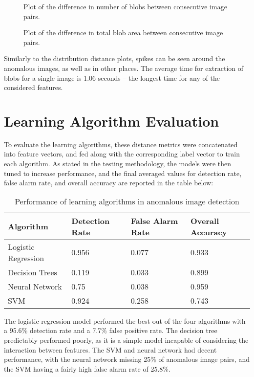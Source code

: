 \begin{figure}[htb]
\centering
\scalebox{1.0}{}
\caption{Plot of the difference in number of blobs between consecutive image pairs.}
\label{fig:tamu-fig3}
\end{figure}



\begin{figure}[htb]
\centering
\scalebox{1.0}{}
\caption{Plot of the difference in total blob area between consecutive image pairs.}
\label{fig:tamu-fig3}
\end{figure}

Similarly to the distribution distance plots, spikes can be seen around the anomalous images, as well as in other places.
The average time for extraction of blobs for a single image is 1.06 seconds -- the longest time for any of the considered features.

\section{Learning Algorithm Evaluation}

To evaluate the learning algorithms, these distance metrics were concatenated into feature vectors, and fed along with the corresponding label vector to train each algorithm.
As stated in the testing methodology, the models were then tuned to increase performance, and the final averaged values for detection rate, false alarm rate, and overall accuracy are reported in the table below:

\begin{table}[h!]
	\centering
	\begin{tabular}{|l|l|l|l|}
		\hline
		Algorithm & Detection Rate & False Alarm Rate & Overall Accuracy  \\ \hline
		Logistic Regression & 0.956 & 0.077 & 0.933  \\ \hline
		Decision Trees & 0.119 & 0.033 & 0.899  \\ \hline
		Neural Network & 0.75 & 0.038 & 0.959  \\ \hline
		SVM & 0.924 & 0.258  & 0.743 \\ \hline
	\end{tabular}
	\caption{Performance of learning algorithms in anomalous image detection}
\end{table}


The logistic regression model performed the best out of the four algorithms with a 95.6\% detection rate and a 7.7\% false positive rate.
The decision tree predictably performed poorly, as it is a simple model incapable of considering the interaction between features.
The SVM and neural network had decent performance, with the neural network missing 25\% of anomalous image pairs, and the SVM having a fairly high false alarm rate of 25.8\%.

